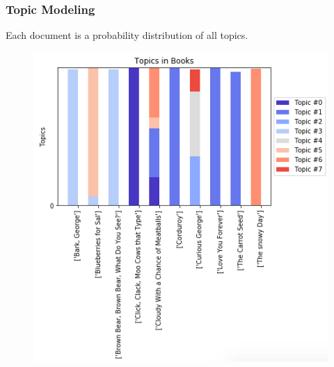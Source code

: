 \documentclass{beamer}
\begin{document}
\begin{frame}
	\frametitle{Topic Modeling}
	Each document is a probability distribution of all topics.
	\begin{figure}
		\includegraphics[width=0.64\linewidth]{topicsbarchart.png}
	\end{figure}
\end{frame}
\end{document}

